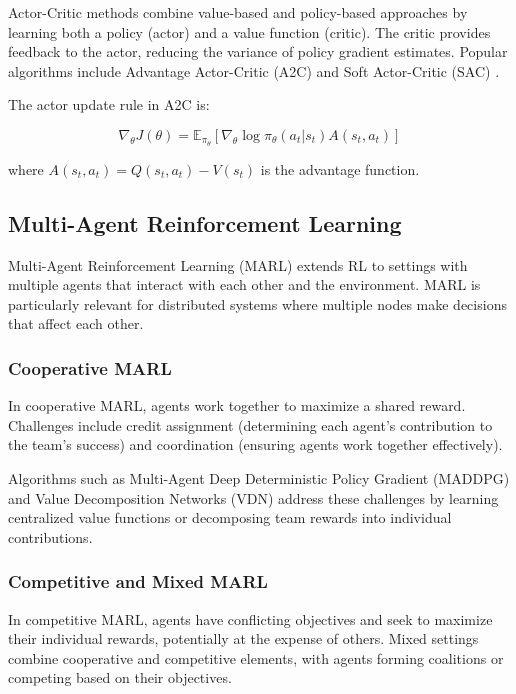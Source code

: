 \documentclass{article}
\begin{document}
Actor-Critic methods combine value-based and policy-based approaches by learning both a policy (actor) and a value function (critic). The critic provides feedback to the actor, reducing the variance of policy gradient estimates. Popular algorithms include Advantage Actor-Critic (A2C) \cite{mnih2016asynchronous} and Soft Actor-Critic (SAC) \cite{haarnoja2018soft}.

The actor update rule in A2C is:

\begin{equation}
\nabla_{\theta} J(\theta) = \mathbb{E}_{\pi_{\theta}}\left[\nabla_{\theta} \log \pi_{\theta}(a_t|s_t) A(s_t, a_t)\right]
\end{equation}

where $A(s_t, a_t) = Q(s_t, a_t) - V(s_t)$ is the advantage function.

\subsection{Multi-Agent Reinforcement Learning}

Multi-Agent Reinforcement Learning (MARL) extends RL to settings with multiple agents that interact with each other and the environment. MARL is particularly relevant for distributed systems where multiple nodes make decisions that affect each other.

\subsubsection{Cooperative MARL}

In cooperative MARL, agents work together to maximize a shared reward. Challenges include credit assignment (determining each agent's contribution to the team's success) and coordination (ensuring agents work together effectively).

Algorithms such as Multi-Agent Deep Deterministic Policy Gradient (MADDPG) \cite{lowe2017multi} and Value Decomposition Networks (VDN) \cite{sunehag2018value} address these challenges by learning centralized value functions or decomposing team rewards into individual contributions.

\subsubsection{Competitive and Mixed MARL}

In competitive MARL, agents have conflicting objectives and seek to maximize their individual rewards, potentially at the expense of others. Mixed settings combine cooperative and competitive elements, with agents forming coalitions or competing based on their objectives.
\end{document}
